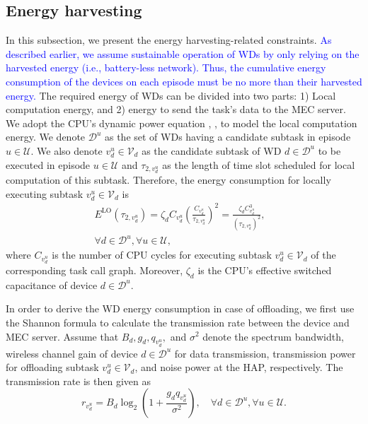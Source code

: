\documentclass[12pt,draftclsnofoot,onecolumn]{IEEEtran}
\begin{document}
\subsection{Energy harvesting}
In this subsection, we present the energy harvesting-related constraints. \textcolor{blue}{As described earlier, we assume sustainable operation of WDs by only relying on the harvested energy (i.e., battery-less network). Thus, the cumulative energy consumption of the devices on each episode must be no more than their harvested energy.} The required energy of WDs can be divided into two parts: 1) Local computation energy, and 2) energy to send the task's data to the MEC server. We adopt the CPU's dynamic power equation \cite{b2}, \cite{b4}, \cite{b13} to model the local computation energy. We denote $\mathcal{D}^u$ as the set of WDs having a candidate subtask in episode $u\in\mathcal{U}$. We also denote $v_d^u\in\mathcal{V}_d$ as the candidate subtask of WD $d\in\mathcal{D}^u$ to be executed in episode $u\in\mathcal{U}$ and $\tau_{2,v_d^u}$ as the length of time slot scheduled for local computation of this subtask. Therefore, the energy consumption for locally executing subtask $v_d^u\in\mathcal{V}_d$ is
\begin{equation}\label{eq3}
	\begin{aligned}
		E^{\text{LO}}(\tau_{2,v_d^u})=\zeta_d C_{v_d^u}\left(\frac{C_{v_d^u}}{\tau_{2,v_d^u}}\right)^2=\frac{\zeta_d C_{v_d^u}^3}{\left(\tau_{2,v_d^u}\right)^2},&\\
		\forall d\in\mathcal{D}^u, \forall u\in\mathcal{U},&
	\end{aligned}
\end{equation}
where $C_{v_d^u}$ is the number of CPU cycles for executing subtask $v_d^u\in\mathcal{V}_d$ of the corresponding task call graph. Moreover, $\zeta_d$ is the CPU's effective switched capacitance \cite{b13} of device $d\in\mathcal{D}^u$. 

In order to derive the WD energy consumption in case of offloading, we first use the Shannon formula to calculate the transmission rate between the device and MEC server. Assume that $B_d,g_d,q_{v_d^u},$ and $\sigma^2$ denote the spectrum bandwidth, wireless channel gain of device $d\in\mathcal{D}^u$ for data transmission, transmission power for offloading subtask $v_d^u\in\mathcal{V}_d$, and noise power at the HAP, respectively. The transmission rate is then given as
\begin{equation}\label{eq4}
	r_{v_d^u}=B_d\log_2\left(1+\frac{g_dq_{v_d^u}}{\sigma^2}\right),\quad\forall d\in\mathcal{D}^u, \forall u\in\mathcal{U}.
\end{equation}
\end{document}
